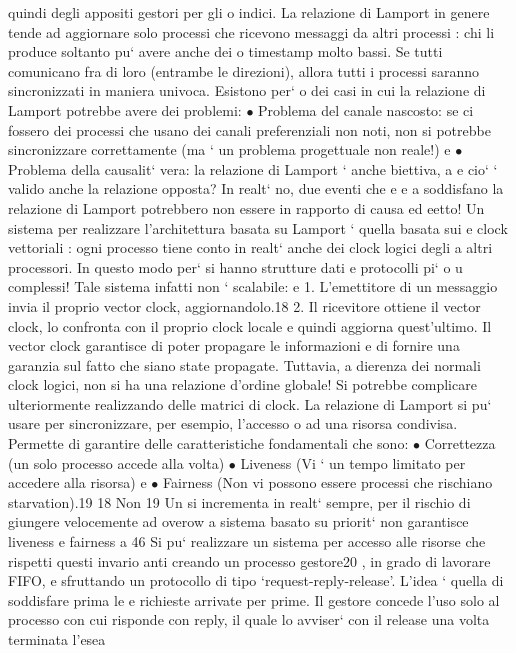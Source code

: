 \documentclass[a4paper,12pt]{article}
\begin{document}
quindi degli appositi gestori per gli
o
indici.
La relazione di Lamport in genere tende ad aggiornare solo processi che
ricevono messaggi da altri processi : chi li produce soltanto pu` avere anche dei
o
timestamp molto bassi. Se tutti comunicano fra di loro (entrambe le direzioni),
allora tutti i processi saranno sincronizzati in maniera univoca. Esistono per`
o
dei casi in cui la relazione di Lamport potrebbe avere dei problemi:
$\bullet$ Problema del canale nascosto: se ci fossero dei processi che usano dei
canali preferenziali non noti, non si potrebbe sincronizzare correttamente
(ma ` un problema progettuale non reale!)
e
$\bullet$ Problema della causalit` vera: la relazione di Lamport ` anche biettiva,
a
e
cio` ` valido anche la relazione opposta? In realt` no, due eventi che
e e
a
soddisfano la relazione di Lamport potrebbero non essere in rapporto di
causa ed eetto!
Un sistema per realizzare l'architettura basata su Lamport ` quella basata sui
e
clock vettoriali : ogni processo tiene conto in realt` anche dei clock logici degli
a
altri processori. In questo modo per` si hanno strutture dati e protocolli pi`
o
u
complessi! Tale sistema infatti non ` scalabile:
e
1. L'emettitore di un messaggio invia il proprio vector clock, aggiornandolo.18
2. Il ricevitore ottiene il vector clock, lo confronta con il proprio clock locale
e quindi aggiorna quest'ultimo.
Il vector clock garantisce di poter propagare le informazioni e di fornire una
garanzia sul fatto che siano state propagate. Tuttavia, a dierenza dei normali
clock logici, non si ha una relazione d'ordine globale! Si potrebbe complicare
ulteriormente realizzando delle matrici di clock.
La relazione di Lamport si pu` usare per sincronizzare, per esempio, l'accesso
o
ad una risorsa condivisa. Permette di garantire delle caratteristiche fondamentali che sono:
$\bullet$ Correttezza (un solo processo accede alla volta)
$\bullet$ Liveness (Vi ` un tempo limitato per accedere alla risorsa)
e
$\bullet$ Fairness (Non vi possono essere processi che rischiano starvation).19
18 Non
19 Un
si incrementa in realt` sempre, per il rischio di giungere velocemente ad overow
a
sistema basato su priorit` non garantisce liveness e fairness
a
46
\newpage
Si pu` realizzare un sistema per accesso alle risorse che rispetti questi invario
anti creando un processo gestore20 , in grado di lavorare FIFO, e sfruttando un
protocollo di tipo {`}request-reply-release'. L'idea ` quella di soddisfare prima le
e
richieste arrivate per prime. Il gestore concede l'uso solo al processo con cui
risponde con reply, il quale lo avviser` con il release una volta terminata l'esea
\end{document}
